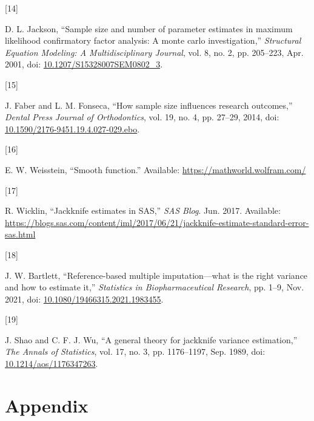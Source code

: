 \documentclass[
  letterpaper,
  DIV=11,
  numbers=noendperiod]{scrreprt}
\newlength{\cslhangindent}
\newlength{\csllabelwidth}
\newlength{\cslentryspacingunit} %
\newenvironment{CSLReferences}[2] %
 {%
  \setlength{\parindent}{0pt}
  \ifodd #1
  \let\oldpar\par
  \def\par{\hangindent=\cslhangindent\oldpar}
  \fi
  \setlength{\parskip}{#2\cslentryspacingunit}
 }%
 {}
\newcommand{\CSLLeftMargin}[1]{\parbox[t]{\csllabelwidth}{#1}}
\newcommand{\CSLRightInline}[1]{\parbox[t]{\linewidth - \csllabelwidth}{#1}\break}
\begin{document}
\begin{CSLReferences}{0}{0}
\leavevmode{}%
\CSLLeftMargin{{[}14{]} }%
\CSLRightInline{D. L. Jackson, {``Sample size and number of parameter
estimates in maximum likelihood confirmatory factor analysis: A monte
carlo investigation,''} \emph{Structural Equation Modeling: A
Multidisciplinary Journal}, vol. 8, no. 2, pp. 205--223, Apr. 2001, doi:
\href{https://doi.org/10.1207/S15328007SEM0802_3}{10.1207/S15328007SEM0802\_3}.}

\leavevmode{}%
\CSLLeftMargin{{[}15{]} }%
\CSLRightInline{J. Faber and L. M. Fonseca, {``How sample size
influences research outcomes,''} \emph{Dental Press Journal of
Orthodontics}, vol. 19, no. 4, pp. 27--29, 2014, doi:
\href{https://doi.org/10.1590/2176-9451.19.4.027-029.ebo}{10.1590/2176-9451.19.4.027-029.ebo}.}

\leavevmode{}%
\CSLLeftMargin{{[}16{]} }%
\CSLRightInline{E. W. Weisstein, {``Smooth function.''} Available:
\url{https://mathworld.wolfram.com/}}

\leavevmode{}%
\CSLLeftMargin{{[}17{]} }%
\CSLRightInline{R. Wicklin, {``Jackknife estimates in SAS,''} \emph{SAS
Blog}. Jun. 2017. Available:
\url{https://blogs.sas.com/content/iml/2017/06/21/jackknife-estimate-standard-error-sas.html}}

\leavevmode{}%
\CSLLeftMargin{{[}18{]} }%
\CSLRightInline{J. W. Bartlett, {``Reference-based multiple
imputation---what is the right variance and how to estimate it,''}
\emph{Statistics in Biopharmaceutical Research}, pp. 1--9, Nov. 2021,
doi:
\href{https://doi.org/10.1080/19466315.2021.1983455}{10.1080/19466315.2021.1983455}.}

\leavevmode{}%
\CSLLeftMargin{{[}19{]} }%
\CSLRightInline{J. Shao and C. F. J. Wu, {``A general theory for
jackknife variance estimation,''} \emph{The Annals of Statistics}, vol.
17, no. 3, pp. 1176--1197, Sep. 1989, doi:
\href{https://doi.org/10.1214/aos/1176347263}{10.1214/aos/1176347263}.}

\end{CSLReferences}


\hypertarget{appendix}{%
\chapter*{Appendix}\label{appendix}}
\end{document}
